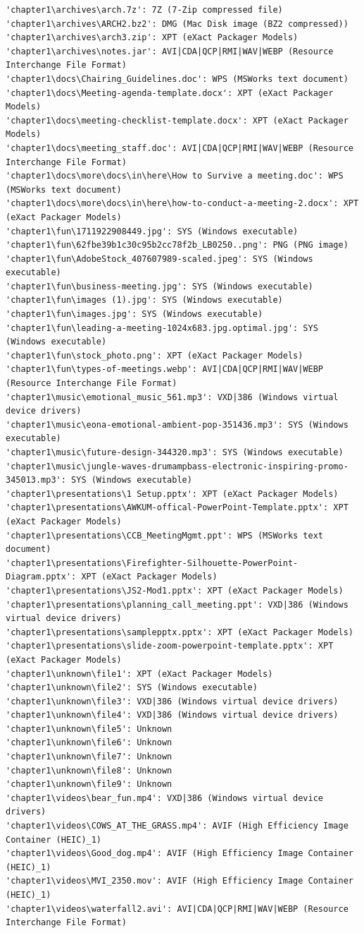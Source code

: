 \documentclass[pdflatex,sn-mathphys-num]{sn-jnl}
\begin{document}
\begin{lstlisting}[style=fileresultstyle]
'chapter1\archives\arch.7z': 7Z (7-Zip compressed file)
'chapter1\archives\ARCH2.bz2': DMG (Mac Disk image (BZ2 compressed))
'chapter1\archives\arch3.zip': XPT (eXact Packager Models)
'chapter1\archives\notes.jar': AVI|CDA|QCP|RMI|WAV|WEBP (Resource Interchange File Format)
'chapter1\docs\Chairing_Guidelines.doc': WPS (MSWorks text document)
'chapter1\docs\Meeting-agenda-template.docx': XPT (eXact Packager Models)
'chapter1\docs\meeting-checklist-template.docx': XPT (eXact Packager Models)
'chapter1\docs\meeting_staff.doc': AVI|CDA|QCP|RMI|WAV|WEBP (Resource Interchange File Format)
'chapter1\docs\more\docs\in\here\How to Survive a meeting.doc': WPS (MSWorks text document)
'chapter1\docs\more\docs\in\here\how-to-conduct-a-meeting-2.docx': XPT (eXact Packager Models)
'chapter1\fun\1711922908449.jpg': SYS (Windows executable)
'chapter1\fun\62fbe39b1c30c95b2cc78f2b_LB0250..png': PNG (PNG image)
'chapter1\fun\AdobeStock_407607989-scaled.jpeg': SYS (Windows executable)
'chapter1\fun\business-meeting.jpg': SYS (Windows executable)
'chapter1\fun\images (1).jpg': SYS (Windows executable)
'chapter1\fun\images.jpg': SYS (Windows executable)
'chapter1\fun\leading-a-meeting-1024x683.jpg.optimal.jpg': SYS (Windows executable)
'chapter1\fun\stock_photo.png': XPT (eXact Packager Models)
'chapter1\fun\types-of-meetings.webp': AVI|CDA|QCP|RMI|WAV|WEBP (Resource Interchange File Format)
'chapter1\music\emotional_music_561.mp3': VXD|386 (Windows virtual device drivers)
'chapter1\music\eona-emotional-ambient-pop-351436.mp3': SYS (Windows executable)
'chapter1\music\future-design-344320.mp3': SYS (Windows executable)
'chapter1\music\jungle-waves-drumampbass-electronic-inspiring-promo-345013.mp3': SYS (Windows executable)
'chapter1\presentations\1 Setup.pptx': XPT (eXact Packager Models)
'chapter1\presentations\AWKUM-offical-PowerPoint-Template.pptx': XPT (eXact Packager Models)
'chapter1\presentations\CCB_MeetingMgmt.ppt': WPS (MSWorks text document)
'chapter1\presentations\Firefighter-Silhouette-PowerPoint-Diagram.pptx': XPT (eXact Packager Models)
'chapter1\presentations\JS2-Mod1.pptx': XPT (eXact Packager Models)
'chapter1\presentations\planning_call_meeting.ppt': VXD|386 (Windows virtual device drivers)
'chapter1\presentations\samplepptx.pptx': XPT (eXact Packager Models)
'chapter1\presentations\slide-zoom-powerpoint-template.pptx': XPT (eXact Packager Models)
'chapter1\unknown\file1': XPT (eXact Packager Models)
'chapter1\unknown\file2': SYS (Windows executable)
'chapter1\unknown\file3': VXD|386 (Windows virtual device drivers)
'chapter1\unknown\file4': VXD|386 (Windows virtual device drivers)
'chapter1\unknown\file5': Unknown
'chapter1\unknown\file6': Unknown
'chapter1\unknown\file7': Unknown
'chapter1\unknown\file8': Unknown
'chapter1\unknown\file9': Unknown
'chapter1\videos\bear_fun.mp4': VXD|386 (Windows virtual device drivers)
'chapter1\videos\COWS_AT_THE_GRASS.mp4': AVIF (High Efficiency Image Container (HEIC)_1)
'chapter1\videos\Good_dog.mp4': AVIF (High Efficiency Image Container (HEIC)_1)
'chapter1\videos\MVI_2350.mov': AVIF (High Efficiency Image Container (HEIC)_1)
'chapter1\videos\waterfall2.avi': AVI|CDA|QCP|RMI|WAV|WEBP (Resource Interchange File Format)
\end{lstlisting}
\end{document}
